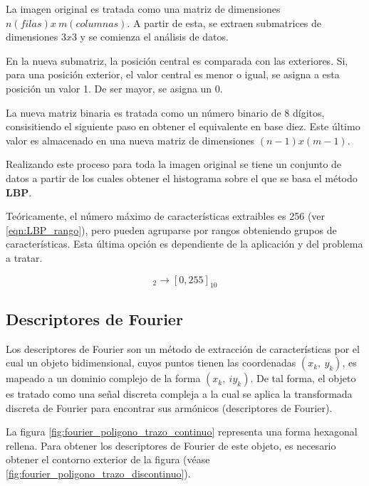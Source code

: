La imagen original es tratada como una matriz de dimensiones $ n(filas) x\: m(columnas) $. A partir de esta, se extraen submatrices de dimensiones $3x3$ y se comienza el análisis de datos.

En la nueva submatriz, la posición central es comparada con las exteriores. Si, para una posición exterior, el valor central es menor o igual, se asigna a esta posición un valor 1. De ser mayor, se asigna un 0.

La nueva matriz binaria es tratada como un número binario de 8 dígitos, consisitiendo el siguiente paso en obtener el equivalente en base diez. Este último valor es almacenado en una nueva matriz de dimensiones $(n-1)x(m-1)$.

Realizando este proceso para toda la imagen original se tiene un conjunto de datos a partir de los cuales obtener el histograma sobre el que se basa el método \textbf{LBP}.

Teóricamente, el número máximo de características extraibles es 256 (ver \ref{eqn:LBP_rango}), pero pueden agruparse por rangos obteniendo grupos de características. Esta última opción es dependiente de la aplicación y del problema a tratar.

\begin{equation}
	[00000000, 11111111]_{2} \rightarrow [0, 255]_{10}
	\label{eqn:LBP_rango}
\end{equation}

\pagebreak
\subsection{Descriptores de Fourier}

Los descriptores de Fourier son un método de extracción de características por el cual un objeto bidimensional, cuyos puntos tienen las coordenadas $ (x_{k},\:y_{k})$, es mapeado a un dominio complejo de la forma $(x_{k},\:iy_{k})$. De tal forma, el objeto es tratado como una señal discreta compleja a la cual se aplica la transformada discreta de Fourier para encontrar sus armónicos (descriptores de Fourier).

La figura \ref{fig:fourier_poligono_trazo_continuo} representa una forma hexagonal rellena. Para obtener los descriptores de Fourier de este objeto, es necesario obtener el contorno exterior de la figura (véase \ref{fig:fourier_poligono_trazo_discontinuo}).

